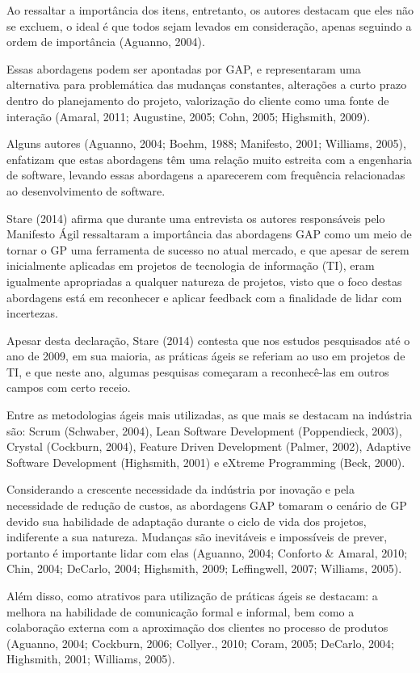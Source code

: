Ao ressaltar a importância dos itens, entretanto, os autores destacam que eles não se excluem, o ideal é que todos sejam levados em consideração, apenas seguindo a ordem de importância (Aguanno, 2004).

Essas abordagens podem ser apontadas por GAP, e representaram uma alternativa para problemática das mudanças constantes, alterações a curto prazo dentro do planejamento do projeto, valorização do cliente como uma fonte de interação (Amaral, 2011; Augustine, 2005; Cohn, 2005; Highsmith, 2009).

Alguns autores (Aguanno, 2004; Boehm, 1988; Manifesto, 2001; Williams, 2005), enfatizam que estas abordagens têm uma relação muito estreita com a engenharia de software, levando essas abordagens a aparecerem com frequência relacionadas ao desenvolvimento de software.

Stare (2014) afirma que durante uma entrevista os autores responsáveis pelo Manifesto Ágil ressaltaram a importância das abordagens GAP como um meio de tornar o GP uma ferramenta de sucesso no atual mercado, e que apesar de serem inicialmente aplicadas em projetos de tecnologia de informação (TI), eram igualmente apropriadas a qualquer natureza de projetos, visto que o foco destas abordagens está em reconhecer e aplicar feedback com a finalidade de lidar com incertezas.

Apesar desta declaração, Stare (2014) contesta que nos estudos pesquisados até o ano de 2009, em sua maioria, as práticas ágeis se referiam ao uso em projetos de TI, e que neste ano, algumas pesquisas começaram a reconhecê-las em outros campos com certo receio.

Entre as metodologias ágeis mais utilizadas, as que mais se destacam na indústria são: Scrum (Schwaber, 2004), Lean Software Development (Poppendieck, 2003), Crystal (Cockburn, 2004), Feature Driven Development (Palmer, 2002), Adaptive Software Development (Highsmith, 2001) e eXtreme Programming (Beck, 2000).

Considerando a crescente necessidade da indústria por inovação e pela necessidade de redução de custos, as abordagens GAP tomaram o cenário de GP devido sua habilidade de adaptação durante o ciclo de vida dos projetos, indiferente a sua natureza. Mudanças são inevitáveis e impossíveis de prever, portanto é importante lidar com elas (Aguanno, 2004; Conforto \& Amaral, 2010; Chin, 2004; DeCarlo, 2004; Highsmith, 2009; Leffingwell, 2007; Williams, 2005).

Além disso, como atrativos para utilização de práticas ágeis se destacam: a melhora na habilidade de comunicação formal e informal, bem como a colaboração externa com a aproximação dos clientes no processo de produtos (Aguanno, 2004; Cockburn, 2006; Collyer., 2010; Coram, 2005; DeCarlo, 2004; Highsmith, 2001; Williams, 2005).

